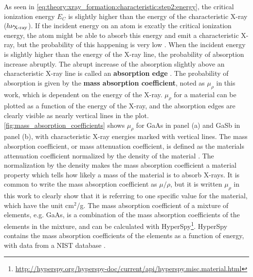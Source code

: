 As seen in \cref{eq:theory:xray_formation:characteristic:step2:energy}, the critical ionization energy $E_C$ is slightly higher than the energy of the characteristic X-ray ($h\nu_{\textnormal{X-ray}}$).
If the incident energy on an atom is excatly the critical ionization energy, the atom might be able to absorb this energy and emit a characteristic X-ray, but the probability of this happening is very low \cite{hollas_modern_2004,goldstein_scanning_2018}.
When the incident energy is slightly higher than the energy of the X-ray line, the probability of absorption increase abruptly.
The abrupt increase of the absorption slightly above an characteristic X-ray line is called an \textbf{absorption edge} \cite{goldstein_scanning_2018}.
The probability of absorption is given by the \textbf{mass absorption coefficient}, noted as $\mu_\rho$ in this work, which is dependent on the energy of the X-ray.
$\mu_\rho$ for a material can be plotted as a function of the energy of the X-ray, and the absorption edges are clearly visible as nearly vertical lines in the plot.
\cref{fig:mass_absorption_coefficients} shows $\mu_\rho$ for GaAs in panel (a) and GaSb in panel (b), with characteristic X-ray energies marked with vertical lines.
The mass absorption coefficient, or mass attenuation coefficient, is defined as the materials attenuation coefficient normalized by the density of the material \cite{goldstein_scanning_2018}.
The normalization by the density makes the mass absorption coefficient a material property which tells how likely a mass of the material is to absorb X-rays.
It is common to write the mass absorption coefficient as $\mu/\rho$, but it is written $\mu_\rho$ in this work to clearly show that it is referring to one specific value for the material, which have the unit cm$^2$/g.
The mass absorption coefficient of a mixture of elements, e.g. GaAs, is a combination of the mass absorption coefficients of the elements in the mixture, and can be calculated with HyperSpy\footnote{\url{http://hyperspy.org/hyperspy-doc/current/api/hyperspy.misc.material.html}}.
HyperSpy contains the mass absorption coefficients of the elements as a function of energy, with data from a NIST database \cite{nist_xraydatabase_hyperspy}.

